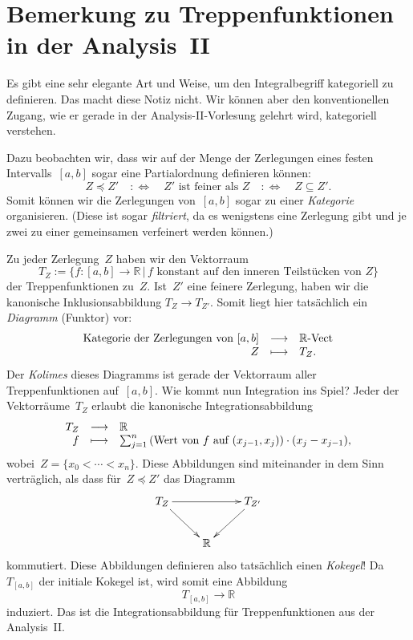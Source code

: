 \documentclass[a4paper,ngerman]{scrartcl}
\newcommand{\RR}{\mathbb{R}}
\begin{document}
\section*{Bemerkung zu Treppenfunktionen in der Analysis~II}

Es gibt eine sehr elegante Art und Weise, um den Integralbegriff kategoriell zu
definieren. Das macht diese Notiz nicht. Wir können aber den konventionellen
Zugang, wie er gerade in der Analysis-II-Vorlesung gelehrt wird, kategoriell
verstehen.

Dazu beobachten wir, dass wir auf der Menge der Zerlegungen eines festen
Intervalls~$[a,b]$ sogar eine Partialordnung definieren können:
\[ Z \preceq Z' \quad:\Longleftrightarrow\quad
  \text{$Z'$ ist feiner als~$Z$}
  \quad:\Longleftrightarrow\quad
  Z \subseteq Z'. \]
Somit können wir die Zerlegungen von~$[a,b]$ sogar zu einer \emph{Kategorie}
organisieren. (Diese ist sogar \emph{filtriert}, da es wenigstens eine
Zerlegung gibt und je zwei zu einer gemeinsamen verfeinert werden können.)

Zu jeder Zerlegung~$Z$ haben wir den Vektorraum
\[ T_Z := \{ f : [a,b] \to \RR \,|\, \text{$f$ konstant auf
den inneren Teilstücken von~$Z$} \} \]
der Treppenfunktionen zu~$Z$. Ist~$Z'$ eine feinere Zerlegung, haben wir die
kanonische Inklusionsabbildung
$T_Z \longrightarrow T_{Z'}$.
Somit liegt hier tatsächlich ein \emph{Diagramm} (Funktor) vor:
\[ \begin{array}{@{}rcl@{}}
  \text{Kategorie der Zerlegungen von $[a,b]$}
    &\longrightarrow& \RR\text{-}\mathrm{Vect} \\
  Z &\longmapsto& T_Z.
\end{array} \]
Der \emph{Kolimes} dieses Diagramms ist gerade der Vektorraum aller
Treppenfunktionen auf~$[a,b]$.
Wie kommt nun Integration ins Spiel? Jeder der Vektorräume~$T_Z$ erlaubt die
kanonische Integrationsabbildung
\[ \begin{array}{@{}rcl@{}}
  T_Z &\longrightarrow& \RR \\
  f &\longmapsto&
    \sum_{j=1}^n \text{(Wert von~$f$ auf~$(x_{j-1},x_j)$)} \cdot (x_j - x_{j-1}),
\end{array} \]
wobei~$Z = \{ x_0 < \cdots < x_n \}$. Diese Abbildungen sind miteinander in dem
Sinn verträglich, als dass für~$Z \preceq Z'$ das Diagramm
\[ \xymatrix{
  T_Z \ar[rr] \ar[dr] && T_{Z'} \ar[dl] \\
  & \RR
} \]
kommutiert. Diese Abbildungen definieren also tatsächlich einen \emph{Kokegel}!
Da~$T_{[a,b]}$ der initiale Kokegel ist, wird somit eine Abbildung
\[ T_{[a,b]} \longrightarrow \RR \]
induziert. Das ist die Integrationsabbildung für Treppenfunktionen aus der
Analysis~II.
\end{document}
